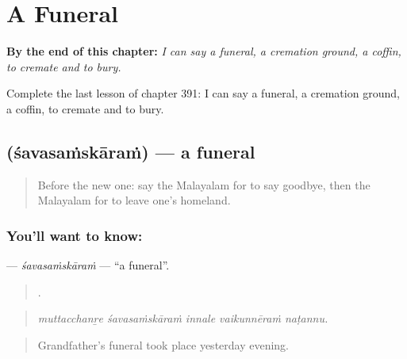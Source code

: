 
\chapter{A Funeral}
\label{ch:ml-a-funeral}

\begin{chapteropening}
\textbf{By the end of this chapter:} \emph{I can say a funeral, a cremation ground, a coffin, to cremate and to bury.}

Complete the last lesson of chapter 391: I can say a funeral, a cremation ground, a coffin, to cremate and to bury.
\end{chapteropening}

\section[\texorpdfstring{\ml{ശവസംസ്കാരം} (śavasaṁskāraṁ)}{ശവസംസ്കാരം (śavasaṁskāraṁ)}]{ (śavasaṁskāraṁ) — a funeral}

\label{lesson:ML-C391-savasamskaram}



\begin{quote}
Before the new one: say the Malayalam for to say goodbye, then the Malayalam for to leave one's homeland.
\end{quote}

\subsection*{You'll want to know: }
\textbf{} — \emph{śavasaṁskāraṁ} — \textquotedblleft{}a funeral\textquotedblright{}.

\begin{quote}
    .
\end{quote}

\begin{quote}
\emph{muttacchanṟe śavasaṁskāraṁ innale vaikunnēraṁ naṭannu.}
\end{quote}

\begin{quote}
Grandfather's funeral took place yesterday evening.
\end{quote}

